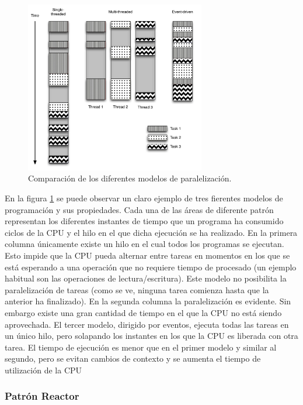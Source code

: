 \begin{figure}[H]
  \centering
  \includegraphics[width=0.7\textwidth]{Chapter2/Figures/threadcomparison}
  \caption[Modelos de paralelización]{Comparación de los diferentes modelos de paralelización\cite{Fettig:2005:TNP:1205685}.}
  \label{fig:threadcomparison}
\end{figure}
En la figura \ref{fig:threadcomparison} se puede observar un claro ejemplo de tres fierentes modelos de programación y sus propiedades. Cada una de las áreas de diferente patrón representan los diferentes instantes de tiempo que un programa ha consumido ciclos de la CPU y el hilo en el que dicha ejecución se ha realizado. En la primera columna únicamente existe un hilo en el cual todos los programas se ejecutan. Esto impide que la CPU pueda alternar entre tareas en momentos en los que se está esperando a una operación que no requiere tiempo de procesado (un ejemplo habitual son las operaciones de lectura/escritura). Este modelo no posibilita la paralelización de tareas (como se ve, ninguna tarea comienza hasta que la anterior ha finalizado). En la segunda columna la paralelización es evidente. Sin embargo existe una gran cantidad de tiempo en el que la CPU no está siendo aprovechada. El tercer modelo, dirigido por eventos, ejecuta todas las tareas en un único hilo, pero solapando los instantes en los que la CPU es liberada con otra tarea. El tiempo de ejecución es menor que en el primer modelo y similar al segundo, pero se evitan cambios de contexto y se aumenta el tiempo de utilización de la CPU



\subsubsection{Patrón Reactor}

